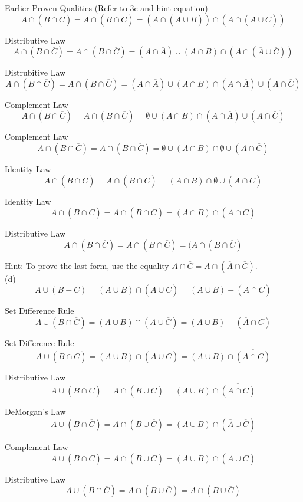 \documentclass[10pt]{article}
\begin{document}
Earlier Proven Qualities (Refer to 3c and hint equation)
$$A \cap (B \cap \overline{C}) = A \cap (B \cap \overline{C}) = (A \cap (\overline{A} \cup B)) \cap (A \cap (\overline{A} \cup \overline{C}))$$

Distributive Law
$$A \cap (B \cap \overline{C}) = A \cap (B \cap \overline{C}) = (A \cap \overline{A}) \cup (A \cap B) \cap (A \cap (\overline{A} \cup \overline{C}))$$

Distrubitive Law
$$A \cap (B \cap \overline{C}) = A \cap (B \cap \overline{C}) = (A \cap \overline{A}) \cup (A \cap B) \cap (A \cap \overline{A}) \cup (A \cap \overline{C})$$

Complement Law
$$A \cap (B \cap \overline{C}) = A \cap (B \cap \overline{C}) = \emptyset \cup (A \cap B) \cap (A \cap \overline{A}) \cup (A \cap \overline{C})$$

Complement Law
$$A \cap (B \cap \overline{C}) = A \cap (B \cap \overline{C}) = \emptyset \cup (A \cap B) \cap \emptyset \cup (A \cap \overline{C})$$

Identity Law
$$A \cap (B \cap \overline{C}) = A \cap (B \cap \overline{C}) =  (A \cap B) \cap \emptyset \cup (A \cap \overline{C})$$

Identity Law
$$A \cap (B \cap \overline{C}) = A \cap (B \cap \overline{C}) = (A \cap B) \cap (A \cap \overline{C})$$

Distributive Law
$$A \cap (B \cap \overline{C}) = A \cap (B \cap \overline{C}) = (A \cap (B \cap \overline{C})$$

Hint: To prove the last form, use the equality $A \cap \overline{C} = A \cap (\overline{A} \cap \overline{C})$.\\

(d)
$$A \cup (B - C) = (A \cup B) \cap (A \cup \overline{C}) = (A \cup B) - (\overline{A} \cap C)$$

Set Difference Rule
$$A \cup (B \cap \overline{C}) = (A \cup B) \cap (A \cup \overline{C}) = (A \cup B) - (\overline{A} \cap C)$$

Set Difference Rule
$$A \cup (B \cap \overline{C}) = (A \cup B) \cap (A \cup \overline{C}) = (A \cup B) \cap \overline{(\overline{A} \cap C)}$$

Distributive Law
$$A \cup (B \cap \overline{C}) = A \cap ( B \cup \overline{C}) = (A \cup B) \cap \overline{(\overline{A} \cap C)}$$

DeMorgan's Law
$$A \cup (B \cap \overline{C}) = A \cap ( B \cup \overline{C}) = (A \cup B) \cap (\overline{\overline{A}} \cup \overline{C})$$

Complement Law
$$A \cup (B \cap \overline{C}) = A \cap ( B \cup \overline{C}) = (A \cup B) \cap (A \cup \overline{C})$$

Distributive Law
$$A \cup (B \cap \overline{C}) = A \cap ( B \cup \overline{C}) = A \cap ( B \cup \overline{C})$$
\end{document}
